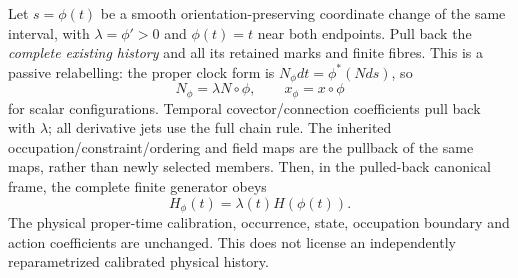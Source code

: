 \documentclass[12pt,a4paper]{article}
\begin{document}
\begin{theorem}
\label{p4:thm:v4118-passive-clock-pullback}
Let $s=\phi(t)$ be a smooth orientation-preserving coordinate change of
the same interval, with $\lambda=\phi'>0$ and $\phi(t)=t$ near both
endpoints. Pull back the \emph{complete existing history} and all its
retained marks and finite fibres. This is a passive relabelling: the proper
clock form is $N_\phi dt=\phi^*(Nds)$, so
\[
 N_\phi=\lambda N\circ\phi,\qquad
 x_\phi=x\circ\phi
\]
for scalar configurations. Temporal covector/connection coefficients
pull back with $\lambda$; all derivative jets use the full chain rule.
The inherited occupation/constraint/ordering and field maps are the
pullback of the same maps, rather than newly selected members.
Then, in the pulled-back canonical frame, the complete finite generator
obeys
\[
 \boxed{H_\phi(t)=\lambda(t)H(\phi(t)).}
\]
The physical proper-time calibration, occurrence, state, occupation
boundary and action coefficients are unchanged. This does not license
an independently reparametrized calibrated physical history.
\end{theorem}
\end{document}
